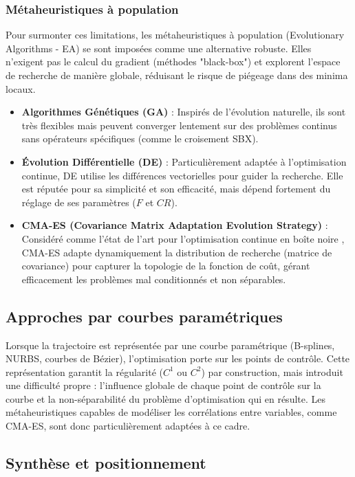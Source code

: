 \subsubsection{Métaheuristiques à population}
Pour surmonter ces limitations, les métaheuristiques à population (Evolutionary Algorithms - EA) se sont imposées comme une alternative robuste. Elles n'exigent pas le calcul du gradient (méthodes "black-box") et explorent l'espace de recherche de manière globale, réduisant le risque de piégeage dans des minima locaux.
\begin{itemize}
    \item \textbf{Algorithmes Génétiques (GA)} : Inspirés de l'évolution naturelle, ils sont très flexibles mais peuvent converger lentement sur des problèmes continus sans opérateurs spécifiques (comme le croisement SBX).
    \item \textbf{Évolution Différentielle (DE)} : Particulièrement adaptée à l'optimisation continue, DE utilise les différences vectorielles pour guider la recherche. Elle est réputée pour sa simplicité et son efficacité, mais dépend fortement du réglage de ses paramètres ($F$ et $CR$).
    \item \textbf{CMA-ES (Covariance Matrix Adaptation Evolution Strategy)} : Considéré comme l'état de l'art pour l'optimisation continue en boîte noire \cite{hansen2001}, CMA-ES adapte dynamiquement la distribution de recherche (matrice de covariance) pour capturer la topologie de la fonction de coût, gérant efficacement les problèmes mal conditionnés et non séparables.
\end{itemize}

\subsection{Approches par courbes paramétriques}

Lorsque la trajectoire est représentée par une courbe paramétrique (B-splines,
NURBS, courbes de Bézier), l'optimisation porte sur les points de contrôle.
Cette représentation garantit la régularité ($C^1$ ou $C^2$) par construction,
mais introduit une difficulté propre : l'influence globale de chaque point de
contrôle sur la courbe et la non-séparabilité du problème d'optimisation qui en
résulte.  Les métaheuristiques capables de modéliser les corrélations entre
variables, comme CMA-ES, sont donc particulièrement adaptées à ce cadre.

\subsection{Synthèse et positionnement}


